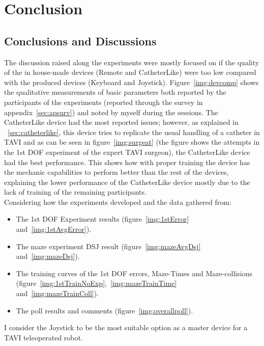 
\chapter{Conclusion}\label{chap:conclusion}


\section{Conclusions and Discussions} \label{conclusiondiscussion}
The discussion raised along the experiments were mostly focused on if the quality of the in house-made devices (Remote and CatheterLike) were too low compared with the produced devices (Keyboard and Joystick). Figure~\ref{img:devcomp} shows the qualitative measurements of basic parameters both reported by the participants of the experiments (reported through the survey in appendix~\ref{sec:apsurv}) and noted by myself during the sessions. The CatheterLike device had the most reported issues; however, as explained in ~\ref{sec:catheterlike}, this device tries to replicate the usual handling of a catheter in TAVI and as can be seen in figure~\ref{img:surgeat} (the figure shows the attempts in the 1st DOF experiment of the expert TAVI surgeon), the CatheterLike device had the best performance. This shows how with proper training the device has the mechanic capabilities to perform better than the rest of the devices, explaining the lower performance of the CatheterLike device mostly due to the lack of training of the remaining participants.\\

Considering how the experiments developed and the data gathered from:
\begin{itemize}
 \item The 1st DOF Experiment results (figure~\ref{img:1stError} and~\ref{img:1stAvgError}).
 \item The maze experiment DSJ result (figure~\ref{img:mazeAvgDsj} and~\ref{img:mazeDsj}).
 \item The training curves of the 1st DOF errors, Maze-Times and Maze-collisions (figure~\ref{img:1stTrainNoExp},~\ref{img:mazeTrainTime} and~\ref{img:mazeTrainColl}).
 \item The poll results and comments (figure~\ref{img:overallpoll}).
\end{itemize}

I consider the Joystick to be the most suitable option as a master device for a TAVI teleoperated robot.\\



